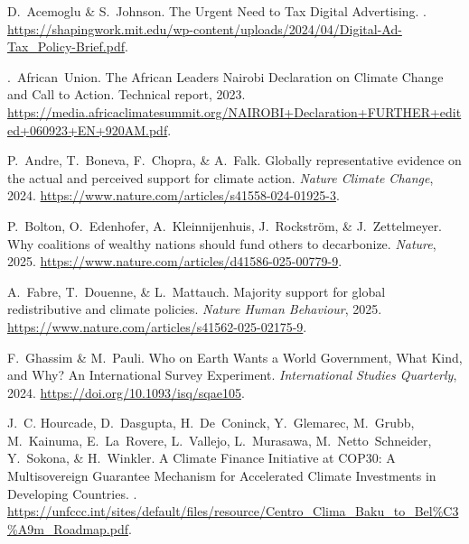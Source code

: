 \documentclass[12pt,english]{article}
\begin{document}
\begin{bibunit}
\begin{thebibliography}{9}
D.~Acemoglu \& S.~Johnson.
\newblock The {{Urgent Need}} to {{Tax Digital Advertising}}.
.
\newblock
  \url{https://shapingwork.mit.edu/wp-content/uploads/2024/04/Digital-Ad-Tax\_Policy-Brief.pdf}.

.~African~Union.
\newblock The {{African Leaders Nairobi Declaration}} on {{Climate Change}} and
  {{Call}} to {{Action}}.
\newblock Technical report, 2023.
\newblock
  \url{https://media.africaclimatesummit.org/NAIROBI+Declaration+FURTHER+edited+060923+EN+920AM.pdf}.

P.~Andre, T.~Boneva, F.~Chopra, \& A.~Falk.
\newblock Globally representative evidence on the actual and perceived support
  for climate action.
\newblock \emph{Nature Climate Change}, 2024.
\newblock \url{https://www.nature.com/articles/s41558-024-01925-3}.

P.~Bolton, O.~Edenhofer, A.~Kleinnijenhuis, J.~Rockstr{\"o}m, \&
  J.~Zettelmeyer.
\newblock Why coalitions of wealthy nations should fund others to decarbonize.
\newblock \emph{Nature}, 2025.
\newblock \url{https://www.nature.com/articles/d41586-025-00779-9}.

A.~Fabre, T.~Douenne, \& L.~Mattauch.
\newblock Majority support for global redistributive and climate policies.
\newblock \emph{Nature Human Behaviour}, 2025.
\newblock \url{https://www.nature.com/articles/s41562-025-02175-9}.

F.~Ghassim \& M.~Pauli.
\newblock Who on {{Earth Wants}} a {{World Government}}, {{What Kind}}, and
  {{Why}}? {{An International Survey Experiment}}.
\newblock \emph{International Studies Quarterly}, 2024.
\newblock \url{https://doi.org/10.1093/isq/sqae105}.

J.~C. Hourcade, D.~Dasgupta, H.~De~Coninck, Y.~Glemarec, M.~Grubb, M.~Kainuma,
  E.~La~Rovere, L.~Vallejo, L.~Murasawa, M.~Netto~Schneider, Y.~Sokona, \&
  H.~Winkler.
\newblock A {{Climate Finance Initiative}} at {{COP30}}: {{A Multisovereign
  Guarantee Mechanism}} for {{Accelerated Climate Investments}} in {{Developing
  Countries}}.
.
\newblock
  \url{https://unfccc.int/sites/default/files/resource/Centro\_Clima\_Baku\_to\_Bel\%C3\%A9m\_Roadmap.pdf}.


\end{thebibliography}
\end{bibunit}
\end{document}
